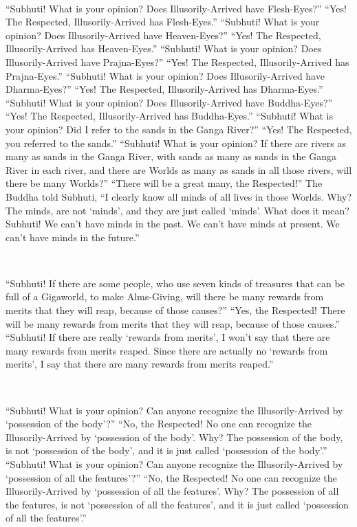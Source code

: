 \documentclass[a5paper,12pt]{book}
\begin{document}
    ~

     ``Subhuti! What is your opinion? Does Illusorily-Arrived have Flesh-Eyes?'' ``Yes! The Respected, Illusorily-Arrived has Flesh-Eyes.'' ``Subhuti! What is your opinion? Does Illusorily-Arrived have Heaven-Eyes?'' ``Yes! The Respected, Illusorily-Arrived has Heaven-Eyes.'' ``Subhuti! What is your opinion? Does Illusorily-Arrived have Prajna-Eyes?'' ``Yes! The Respected, Illusorily-Arrived has Prajna-Eyes.'' ``Subhuti! What is your opinion? Does Illusorily-Arrived have Dharma-Eyes?'' ``Yes! The Respected, Illusorily-Arrived has Dharma-Eyes.'' ``Subhuti! What is your opinion? Does Illusorily-Arrived have Buddha-Eyes?'' ``Yes! The Respected, Illusorily-Arrived has Buddha-Eyes.'' ``Subhuti! What is your opinion? Did I refer to the sands in the Ganga River?'' ``Yes! The Respected, you referred to the sands.'' ``Subhuti! What is your opinion? If there are rivers as many as sands in the Ganga River, with sands as many as sands in the Ganga River in each river, and there are Worlds as many as sands in all those rivers, will there be many Worlds?'' ``There will be a great many, the Respected!'' The Buddha told Subhuti, ``I clearly know all minds of all lives in those Worlds. Why? The minds, are not `minds', and they are just called `minds'. What does it mean? Subhuti! We can't have minds in the past. We can't have minds at present. We can't have minds in the future.''

    ~

     ``Subhuti! If there are some people, who use seven kinds of treasures that can be full of a Gigaworld, to make Alms-Giving, will there be many rewards from merits that they will reap, because of those causes?'' ``Yes, the Respected! There will be many rewards from merits that they will reap, because of those causes.'' ``Subhuti! If there are really `rewards from merits', I won't say that there are many rewards from merits reaped. Since there are actually no `rewards from merits', I say that there are many rewards from merits reaped.''

    ~

     ``Subhuti! What is your opinion? Can anyone recognize the Illusorily-Arrived by `possession of the body'?'' ``No, the Respected! No one can recognize the Illusorily-Arrived by `possession of the body'. Why? The possession of the body, is not `possession of the body', and it is just called `possession of the body'.'' ``Subhuti! What is your opinion? Can anyone recognize the Illusorily-Arrived by `possession of all the features'?'' ``No, the Respected! No one can recognize the Illusorily-Arrived by `possession of all the features'. Why? The possession of all the features, is not `possession of all the features', and it is just called `possession of all the features'.''
\end{document}
